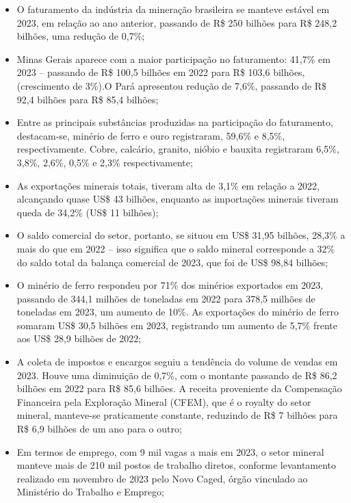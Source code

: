 \begin{itemize}
\item O faturamento da indústria da mineração brasileira se manteve estável em 2023, em relação ao ano anterior, passando de R\$ 250 bilhões para R\$ 248,2 bilhões, uma redução de 0,7\%;

\item Minas Gerais aparece com a maior participação no faturamento: 41,7\% em 2023 -- passando de R\$ 100,5 bilhões em 2022 para R\$ 103,6 bilhões, (crescimento de 3\%).O Pará apresentou redução de 7,6\%, passando de R\$ 92,4 bilhões para R\$ 85,4 bilhões;

\item Entre as principais substâncias produzidas na participação do faturamento, destacam-se, minério de ferro e ouro registraram, 59,6\% e 8,5\%, respectivamente. Cobre, calcário, granito, nióbio e bauxita registraram 6,5\%, 3,8\%, 2,6\%, 0,5\% e 2,3\% respectivamente;

\item As exportações minerais totais, tiveram alta de 3,1\% em relação a 2022, alcançando quase US\$ 43 bilhões, enquanto as importações minerais tiveram queda de 34,2\% (US\$ 11 bilhões);

\item O saldo comercial do setor, portanto, se situou em US\$ 31,95 bilhões, 28,3\% a mais do que em 2022 -- isso significa que o saldo mineral corresponde a 32\% do saldo total da balança comercial de 2023, que foi de US\$ 98,84 bilhões;

\item O minério de ferro respondeu por 71\% dos minérios exportados em 2023, passando de 344,1 milhões de toneladas em 2022 para 378,5 milhões de toneladas em 2023, um aumento de 10\%. As exportações do minério de ferro somaram US\$ 30,5 bilhões em 2023, registrando um aumento de 5,7\% frente aos US\$ 28,9 bilhões de 2022;

\item A coleta de impostos e encargos seguiu a tendência do volume de vendas em 2023. Houve uma diminuição de 0,7\%, com o montante passando de R\$ 86,2 bilhões em 2022 para R\$ 85,6 bilhões. A receita proveniente da Compensação Financeira pela Exploração Mineral (CFEM), que é o royalty do setor mineral, manteve-se
    praticamente constante, reduzindo de R\$ 7 bilhões para R\$ 6,9 bilhões de um ano para o outro;

\item Em termos de emprego, com 9 mil vagas a mais em 2023, o setor mineral manteve mais de 210 mil postos de trabalho diretos, conforme levantamento realizado em novembro de 2023 pelo Novo Caged, órgão vinculado ao Ministério do Trabalho e Emprego;


\end{itemize}
